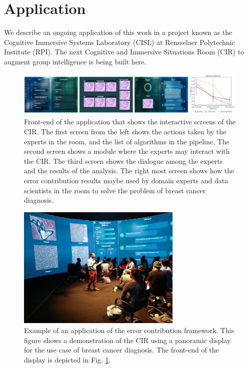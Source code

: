\section{Application}
We describe an ongoing application of this work in a project known as the Cognitive Immersive Systems Laboratory \cite{su2017cognitive} (CISL) at Rensselaer Polytechnic Institute (RPI). The next Cognitive and Immersive Situations Room (CIR) to augment group intelligence is being built here.

\begin{figure}[ht!]
    \centering
    \includegraphics[width=\textwidth]{img/EP/CISL}
    \caption{Front-end of the application that shows the interactive screens of the CIR. The first screen from the left shows the actions taken by the experts in the room, and the list of algorithms in the pipeline, The second screen shows a module where the experts may interact with the CIR. The third screen shows the dialogue among the experts and the results of the analysis. The right most screen shows how the error contribution results maybe used by domain experts and data scientists in the room to solve the problem of breast cancer diagnosis.}
    \label{fig:CISL}
\end{figure}

\begin{figure}[ht!]
    \centering
    \includegraphics[width=0.7\textwidth]{img/EP/CIR.jpg}
    \caption{Example of an application of the error contribution framework. This figure shows a demonstration of the CIR using a panoramic display for the use case of breast cancer diagnosis. The front-end of the display is depicted in Fig. \ref{fig:CISL}.}
    \label{fig:CIR}
\end{figure}

